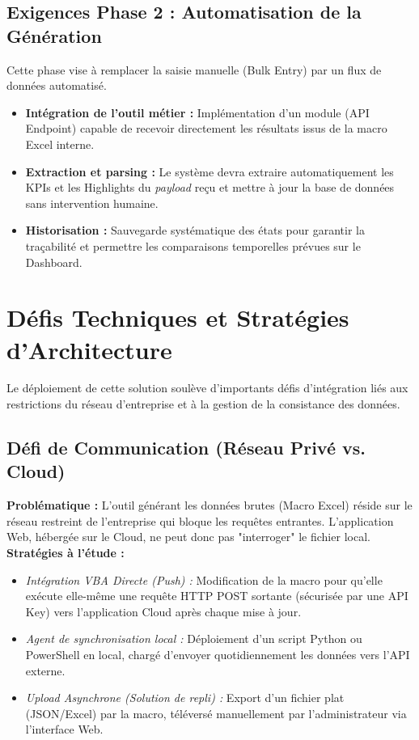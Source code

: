 \subsection{Exigences Phase 2 : Automatisation de la Génération}
Cette phase vise à remplacer la saisie manuelle (Bulk Entry) par un flux de données automatisé.
\begin{itemize}
    \item \textbf{Intégration de l'outil métier :} Implémentation d'un module (API Endpoint) capable de recevoir directement les résultats issus de la macro Excel interne.
    \item \textbf{Extraction et parsing :} Le système devra extraire automatiquement les KPIs et les Highlights du \textit{payload} reçu et mettre à jour la base de données sans intervention humaine.
    \item \textbf{Historisation :} Sauvegarde systématique des états pour garantir la traçabilité et permettre les comparaisons temporelles prévues sur le Dashboard.
\end{itemize}

\section{Défis Techniques et Stratégies d'Architecture}
Le déploiement de cette solution soulève d'importants défis d'intégration liés aux restrictions du réseau d'entreprise et à la gestion de la consistance des données. 

\subsection{Défi de Communication (Réseau Privé vs. Cloud)}
\textbf{Problématique :} L'outil générant les données brutes (Macro Excel) réside sur le réseau restreint de l'entreprise qui bloque les requêtes entrantes. L'application Web, hébergée sur le Cloud, ne peut donc pas "interroger" le fichier local. \\
\textbf{Stratégies à l'étude :}
\begin{itemize}
    \item \textit{Intégration VBA Directe (Push) :} Modification de la macro pour qu'elle exécute elle-même une requête HTTP POST sortante (sécurisée par une API Key) vers l'application Cloud après chaque mise à jour.
    \item \textit{Agent de synchronisation local :} Déploiement d'un script Python ou PowerShell en local, chargé d'envoyer quotidiennement les données vers l'API externe.
    \item \textit{Upload Asynchrone (Solution de repli) :} Export d'un fichier plat (JSON/Excel) par la macro, téléversé manuellement par l'administrateur via l'interface Web.
\end{itemize}

